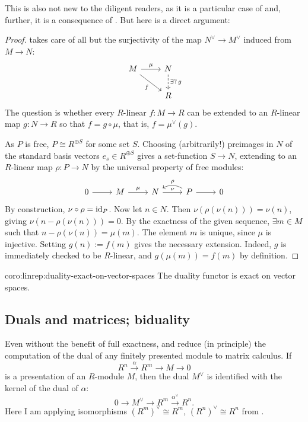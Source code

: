 This is also not new to the diligent readers, as it is a particular
case of  and,
further, it is a consequence of
. But here is a direct
argument:

\begin{proof}
   takes care of all but the surjectivity of
  the map $N^\vee \to M^\vee$ induced from $M \to N$:
  \[
    \begin{tikzcd}
      M \ar[r, "\mu"] \ar[dr, "f"'] &
      N \ar[d, dashed, "\exists?\, g"] \\
      & R
    \end{tikzcd}
  \]
  The question is whether every $R$-linear $f : M \to R$ can be
  extended to an $R$-linear map $g : N \to R$ so that
  $f = g \circ \mu$, that is, $f = \mu^\vee(g)$.

  As $P$ is free, $P \cong R^{\oplus S}$ for some set $S$. Choosing
  (arbitrarily!) preimages in $N$ of the standard basis vectors
  $e_s \in R^{\oplus S}$ gives a set-function $S \to N$, extending to
  an $R$-linear map $\rho : P \to N$ by the universal property of free
  modules:
  \[
    \begin{tikzcd}
      0 \ar[r] & M \ar[r, "\mu"] & N \ar[r, "\nu"] & P \ar[r] \ar[l,
      bend right, "\rho"'] & 0
    \end{tikzcd}
  \]
  By construction, $\nu \circ \rho = \operatorname{id}_P$. Now let $n \in N$. Then
  $\nu(\rho(\nu(n))) = \nu(n)$, giving $\nu(n - \rho(\nu(n))) = 0$. By
  the exactness of the given sequence, $\exists m \in M$ such that
  $n - \rho(\nu(n)) = \mu(m)$. The element $m$ is unique, since $\mu$
  is injective. Setting $g(n) := f(m)$ gives the necessary
  extension. Indeed, $g$ is immediately checked to be $R$-linear, and
  $g(\mu(m)) = f(m)$ by definition.
\end{proof}

\begin{coro}{}{coro:linrep:duality-exact-on-vector-spaces}
  The duality functor is exact on vector spaces.
\end{coro}

\subsection{Duals and matrices; biduality}
\label{subsec:linrep:duals-and-matrices-biduality}
Even without the benefit of full exactness, 
and  reduce (in principle) the computation
of the dual of any finitely presented module to matrix calculus. If
\[
  R^n \xrightarrow{\alpha} R^m \to M \to 0
\]
is a presentation of an $R$-module $M$, then the dual $M^\vee$ is
identified with the kernel of the dual of $\alpha$:
\[
  0 \to M^\vee \to R^m \xrightarrow{\alpha^\vee} R^n.
\]
Here I am applying isomorphisms $(R^m)^\vee \cong R^m$,
$(R^n)^\vee \cong R^n$ from .

